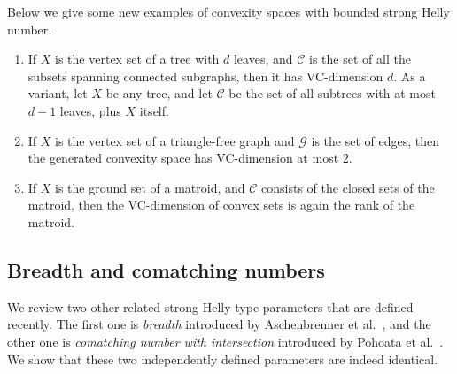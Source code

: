 \documentclass[11pt]{article}
\theoremstyle{definition}
\newcommand{\C}{\mathcal{C}}
\newcommand{\G}{\mathcal{G}}
\begin{document}
Below we give some new examples of convexity spaces with bounded strong Helly number.

\begin{enumerate}
    \item If $X$ is the vertex set of a tree with $d$ leaves, and $\C$ is the set of all the subsets spanning connected subgraphs, then it has VC-dimension $d$. As a variant, let $X$ be any tree, and let $\C$ be the set of all subtrees with at most $d-1$ leaves, plus $X$ itself.

    \item If $X$ is the vertex set of a triangle-free graph and $\G$ is the set of edges, then the generated convexity space has VC-dimension at most $2$.

    \item If $X$ is the ground set of a matroid, and $\C$ consists of the closed sets of the matroid, then the VC-dimension of convex sets is again the rank of the matroid.
\end{enumerate}




\subsection{Breadth and comatching numbers}
We review two other related strong Helly-type parameters that are defined recently.
The first one is \emph{breadth} introduced by Aschenbrenner et al.~\cite{aschenbrenner2016vapnik}, and the other one is \emph{comatching number with intersection} introduced by Pohoata et al.~\cite{pohoata2025colorful}.
We show that these two independently defined parameters are indeed identical.
\end{document}
